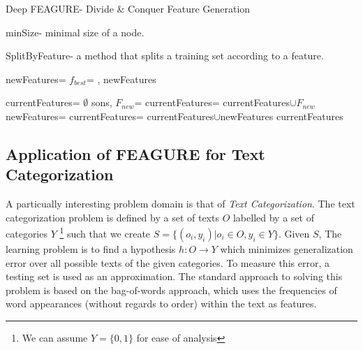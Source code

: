 \documentclass[twoside,11pt]{article}
\theoremstyle{definition}
\begin{document}
\begin{algorithm}[H]
	\caption{Deep FEAGURE- Divide \& Conquer Feature Generation}
	\label{code-tree-thing}
	\small
		minSize- minimal size of a node.

        SplitByFeature- a method that splits a training set according to a feature.
        
		\begin{algorithmic}
                    \State
                    \Return 
                \EndIf
                \State newFeatures=
                \State $f_{best}$=
                \State \Return {}, newFeatures
			\EndFunction

            			
			\State 
                \State currentFeatures= $\emptyset$
                \State sons, $F_{new}$=
                \State currentFeatures= currentFeatures$\cup F_{new}$
                    \State newFeatures=
                    \State currentFeatures= currentFeatures$\cup$newFeatures
                \EndFor
                \State \Return currentFeatures
			\EndFunction
		\end{algorithmic}
	\end{algorithm}

\subsection{Application of FEAGURE for Text Categorization}

A particually interesting problem domain is that of \emph{Text Categorization}.
The text categorization problem is defined by a set of texts $O$ labelled by a set of categories $Y$ \footnote{We can assume $Y=\{0,1\}$ for ease of analysis}
 such that we create $S=\{(o_i,y_i)|o_i\in O, y_i\in Y\}$. Given $S$, The learning problem is to find a hypothesis $h:O\rightarrow Y$ which minimizes generalization error over all possible texts of the given categories. To measure this error, a testing set is used as an approximation.
The standard approach to solving this problem is based on the bag-of-words \cite{Wu:1981:CST:1013228.511759,salton1983introduction} approach, which uses the frequencies of word appearances (without regards to order) within the text as features. 
\end{document}
